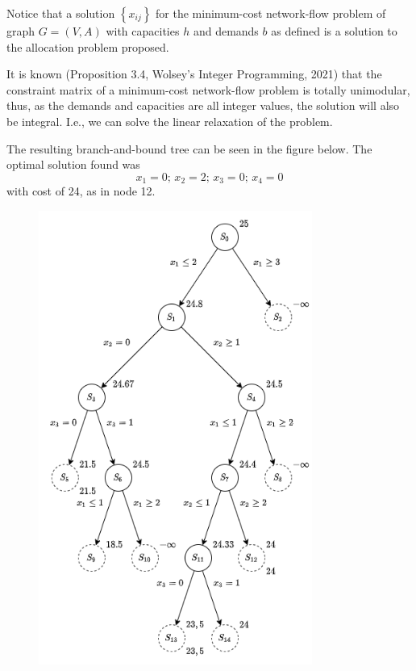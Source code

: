 \documentclass[a4paper]{report}
\begin{document}
Notice that a solution $\left\{ x_{ij} \right\}$ for the minimum-cost network-flow problem of graph $G=\left( V,A \right) $ with capacities $h$ and demands $b$ as defined is a solution to the allocation problem proposed.

It is known (Proposition 3.4, Wolsey's Integer Programming, 2021) that the constraint matrix of a minimum-cost network-flow problem is totally unimodular, thus, as the demands and capacities are all integer values, the solution will also be integral. I.e., we can solve the linear relaxation of the problem.


The resulting branch-and-bound tree can be seen in the figure below. The optimal solution found was \[
x_1 = 0;\, x_2=2;\, x_3=0;\,x_4=0
\] with cost of 24, as in node 12.

\begin{figure}[h!]
    \centering
    \includegraphics[width=0.8\textwidth]{figures/integer_programmin_homework_4.png}
\end{figure}
\end{document}
